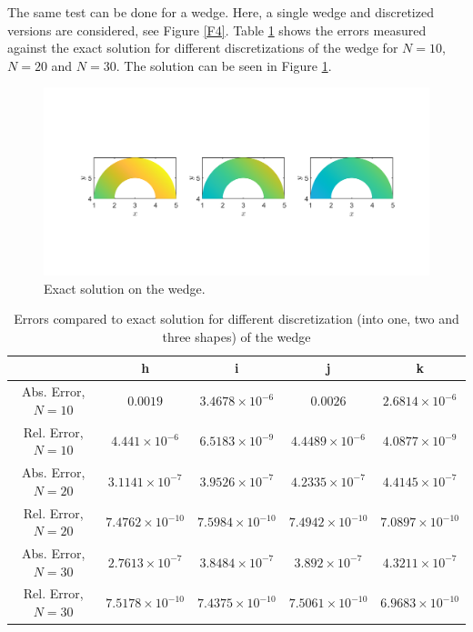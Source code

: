 \documentclass[11pt, a4paper]{article}
\theoremstyle{definition}
\begin{document}
The same test can be done for a wedge. Here, a single wedge and discretized versions are considered, see Figure \ref{F4}. Table \ref{Tab2:ErrorsExWedge} shows the errors measured against the exact solution for different discretizations of the wedge for $N = 10$, $N = 20$ and $N = 30$. The solution can be seen in Figure \ref{F5}.


\begin{figure}[h]
	\centering
	\includegraphics[scale=0.35]{wedgeEx.png}
	\caption{Exact solution on the wedge.} 
	\label{F5}
\end{figure}
\begin{table}
	\caption{Errors compared to exact solution for different discretization (into one, two and three shapes) of the wedge}
	\begin{tabular}{ ||c| c| c| c| c|| }
		\hline
		\hline
		& h & i & j& k\\ 
		\hline
		Abs. Error, $N =10$& $0.0019$ & $3.4678 \times 10^{-6}$ & $0.0026$ & $2.6814\times 10^{-6}$\\  
		Rel. Error, $N =10$& $4.441 \times 10^{-6}$& $6.5183 \times 10^{-9}$ &$4.4489 \times 10^{-6}$ &  $4.0877\times 10^{-9}$\\
		\hline
		Abs. Error, $N =20$& $3.1141 \times 10^{-7}$ & $3.9526 \times 10^{-7}$ & $4.2335\times 10^{-7}$ & $4.4145\times 10^{-7}$\\  
		Rel. Error, $N =20$& $7.4762 \times 10^{-10}$& $7.5984 \times 10^{-10}$ &$7.4942 \times 10^{-10}$ &  $7.0897 \times 10^{-10}$\\
		\hline
		Abs. Error, $N =30$& $ 2.7613\times 10^{-7}$ & $ 3.8484\times 10^{-7}$ & $3.892\times 10^{-7}$ & $4.3211\times 10^{-7}$ \\  
		Rel. Error, $N =30$ & $ 7.5178\times 10^{-10}$& $ 7.4375\times 10^{-10}$ &$7.5061\times 10^{-10}$ & $6.9683\times 10^{-10}$  \\
		\hline
		\hline
	\end{tabular}
	\label{Tab2:ErrorsExWedge}
\end{table}
\end{document}
